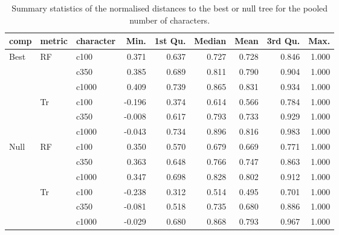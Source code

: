 \begin{table}[ht]
\centering
\begin{tabular}{lllrrrrrr}
  \hline
comp & metric & character & Min. & 1st Qu. & Median & Mean & 3rd Qu. & Max. \\ 
  \hline
Best & RF & c100 & 0.371 & 0.637 & 0.727 & 0.728 & 0.846 & 1.000 \\ 
   &  & c350 & 0.385 & 0.689 & 0.811 & 0.790 & 0.904 & 1.000 \\ 
   &  & c1000 & 0.409 & 0.739 & 0.865 & 0.831 & 0.934 & 1.000 \\ 
   & Tr & c100 & -0.196 & 0.374 & 0.614 & 0.566 & 0.784 & 1.000 \\ 
   &  & c350 & -0.008 & 0.617 & 0.793 & 0.733 & 0.929 & 1.000 \\ 
   &  & c1000 & -0.043 & 0.734 & 0.896 & 0.816 & 0.983 & 1.000 \\ 
  Null & RF & c100 & 0.350 & 0.570 & 0.679 & 0.669 & 0.771 & 1.000 \\ 
   &  & c350 & 0.363 & 0.648 & 0.766 & 0.747 & 0.863 & 1.000 \\ 
   &  & c1000 & 0.347 & 0.698 & 0.828 & 0.802 & 0.912 & 1.000 \\ 
   & Tr & c100 & -0.238 & 0.312 & 0.514 & 0.495 & 0.701 & 1.000 \\ 
   &  & c350 & -0.081 & 0.518 & 0.735 & 0.680 & 0.886 & 1.000 \\ 
   &  & c1000 & -0.029 & 0.680 & 0.868 & 0.793 & 0.967 & 1.000 \\ 
   \hline
\end{tabular}
\caption{Summary statistics of the normalised distances to the best or null tree for the pooled number of characters.} 
\label{Full_Tab_pooledcharacters}
\end{table}
